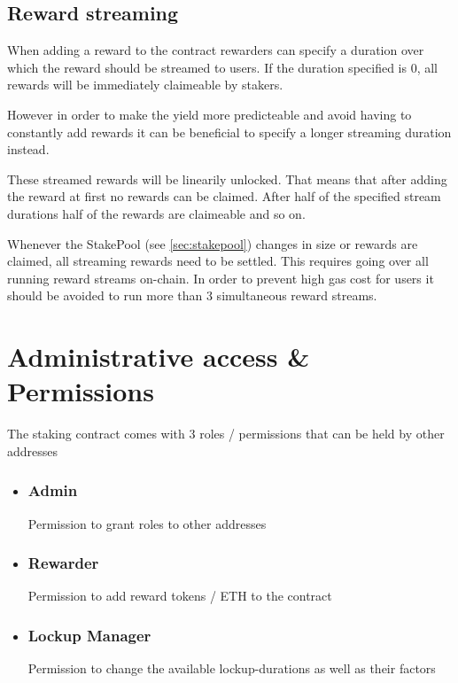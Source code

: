 \documentclass{article}
\begin{document}
\subsection{Reward streaming}
When adding a reward to the contract rewarders can specify a duration over which the reward should be streamed to users.
If the duration specified is 0, all rewards will be immediately claimeable by stakers.

However in order to make the yield more predicteable and avoid having to constantly add rewards
it can be beneficial to specify a longer streaming duration instead.

These streamed rewards will be linearily unlocked. That means that after adding the reward at first no rewards can be claimed.
After half of the specified stream durations half of the rewards are claimeable and so on.

Whenever the StakePool (see \ref{sec:stakepool}) changes in size or rewards are claimed, all streaming rewards need to be settled.
This requires going over all running reward streams on-chain.
In order to prevent high gas cost for users it should be avoided to run more than 3 simultaneous reward streams.

\newpage

\section{Administrative access \& Permissions}
\label{sec:permissions}

The staking contract comes with 3 roles / permissions that can be held by other addresses
\begin{itemize}
    \item \subsubsection{Admin}
        Permission to grant roles to other addresses
    \item \subsubsection{Rewarder}
        Permission to add reward tokens / ETH to the contract
    \item \subsubsection{Lockup Manager}
        Permission to change the available lockup-durations as well as their factors
\end{itemize}
\end{document}
